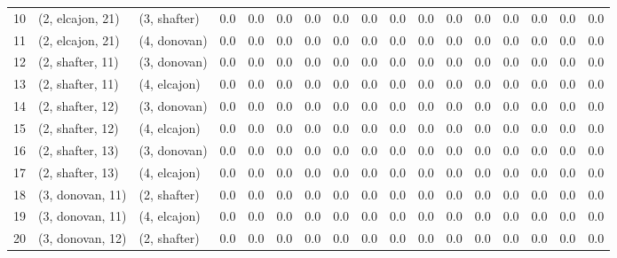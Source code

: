 \begin{tabular}{lllrrrrrrrrrrrrrr}
10 &  (2, elcajon, 21) &     (3, shafter) &      0.0 &     0.0 &        0.0 &       0.0 &      0.0 &      0.0 &      0.0 &        0.0 &       0.0 &     0.0 &     0.0 &     0.0 &       0.0 &      0.0 \\
11 &  (2, elcajon, 21) &     (4, donovan) &      0.0 &     0.0 &        0.0 &       0.0 &      0.0 &      0.0 &      0.0 &        0.0 &       0.0 &     0.0 &     0.0 &     0.0 &       0.0 &      0.0 \\
12 &  (2, shafter, 11) &     (3, donovan) &      0.0 &     0.0 &        0.0 &       0.0 &      0.0 &      0.0 &      0.0 &        0.0 &       0.0 &     0.0 &     0.0 &     0.0 &       0.0 &      0.0 \\
13 &  (2, shafter, 11) &     (4, elcajon) &      0.0 &     0.0 &        0.0 &       0.0 &      0.0 &      0.0 &      0.0 &        0.0 &       0.0 &     0.0 &     0.0 &     0.0 &       0.0 &      0.0 \\
14 &  (2, shafter, 12) &     (3, donovan) &      0.0 &     0.0 &        0.0 &       0.0 &      0.0 &      0.0 &      0.0 &        0.0 &       0.0 &     0.0 &     0.0 &     0.0 &       0.0 &      0.0 \\
15 &  (2, shafter, 12) &     (4, elcajon) &      0.0 &     0.0 &        0.0 &       0.0 &      0.0 &      0.0 &      0.0 &        0.0 &       0.0 &     0.0 &     0.0 &     0.0 &       0.0 &      0.0 \\
16 &  (2, shafter, 13) &     (3, donovan) &      0.0 &     0.0 &        0.0 &       0.0 &      0.0 &      0.0 &      0.0 &        0.0 &       0.0 &     0.0 &     0.0 &     0.0 &       0.0 &      0.0 \\
17 &  (2, shafter, 13) &     (4, elcajon) &      0.0 &     0.0 &        0.0 &       0.0 &      0.0 &      0.0 &      0.0 &        0.0 &       0.0 &     0.0 &     0.0 &     0.0 &       0.0 &      0.0 \\
18 &  (3, donovan, 11) &     (2, shafter) &      0.0 &     0.0 &        0.0 &       0.0 &      0.0 &      0.0 &      0.0 &        0.0 &       0.0 &     0.0 &     0.0 &     0.0 &       0.0 &      0.0 \\
19 &  (3, donovan, 11) &     (4, elcajon) &      0.0 &     0.0 &        0.0 &       0.0 &      0.0 &      0.0 &      0.0 &        0.0 &       0.0 &     0.0 &     0.0 &     0.0 &       0.0 &      0.0 \\
20 &  (3, donovan, 12) &     (2, shafter) &      0.0 &     0.0 &        0.0 &       0.0 &      0.0 &      0.0 &      0.0 &        0.0 &       0.0 &     0.0 &     0.0 &     0.0 &       0.0 &      0.0 \\

\end{tabular}
